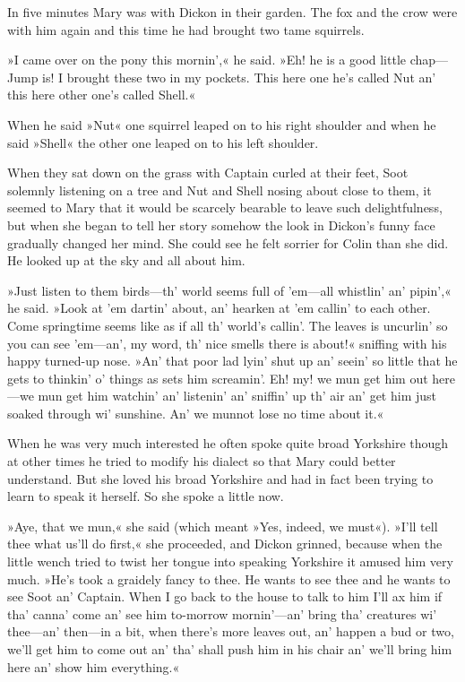 In five minutes Mary was with Dickon in their garden. The fox and the crow were with him again and this time he had brought two tame squirrels.

»I came over on the pony this mornin',« he said. »Eh! he is a good little chap—Jump is! I brought these two in my pockets. This here one he's called Nut an' this here other one's called Shell.«

When he said »Nut« one squirrel leaped on to his right shoulder and when he said »Shell« the other one leaped on to his left shoulder.

When they sat down on the grass with Captain curled at their feet, Soot solemnly listening on a tree and Nut and Shell nosing about close to them, it seemed to Mary that it would be scarcely bearable to leave such delightfulness, but when she began to tell her story somehow the look in Dickon's funny face gradually changed her mind. She could see he felt sorrier for Colin than she did. He looked up at the sky and all about him.

»Just listen to them birds—th' world seems full of 'em—all whistlin' an' pipin',« he said. »Look at 'em dartin' about, an' hearken at 'em callin' to each other. Come springtime seems like as if all th' world's callin'. The leaves is uncurlin' so you can see 'em—an', my word, th' nice smells there is about!« sniffing with his happy turned-up nose. »An' that poor lad lyin' shut up an' seein' so little that he gets to thinkin' o' things as sets him screamin'. Eh! my! we mun get him out here—we mun get him watchin' an' listenin' an' sniffin' up th' air an' get him just soaked through wi' sunshine. An' we munnot lose no time about it.«

When he was very much interested he often spoke quite broad Yorkshire though at other times he tried to modify his dialect so that Mary could better understand. But she loved his broad Yorkshire and had in fact been trying to learn to speak it herself. So she spoke a little now.

»Aye, that we mun,« she said (which meant »Yes, indeed, we must«). »I'll tell thee what us'll do first,« she proceeded, and Dickon grinned, because when the little wench tried to twist her tongue into speaking Yorkshire it amused him very much. »He's took a graidely fancy to thee. He wants to see thee and he wants to see Soot an' Captain. When I go back to the house to talk to him I'll ax him if tha' canna' come an' see him to-morrow mornin'—an' bring tha' creatures wi' thee—an' then—in a bit, when there's more leaves out, an' happen a bud or two, we'll get him to come out an' tha' shall push him in his chair an' we'll bring him here an' show him everything.«

